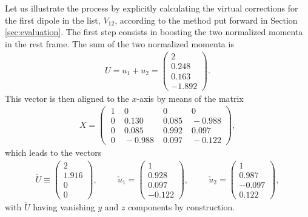 \documentclass[11pt,a4paper]{article}
\begin{document}
Let us illustrate the process by explicitly calculating  the virtual corrections for the first dipole in the list, $V_{12}$, according to the method put forward in Section \ref{sec:evaluation}. The first step consists in boosting the two normalized momenta in the rest frame.
The sum of the two normalized momenta is 
\begin{align}
U=u_1+u_2=\left(\begin{matrix} 2\\0.248\\ 0.163\\-1.892\end{matrix}\right).
\end{align}
This vector is then aligned to the $x$-axis by means of the matrix 
\begin{align}
X =  \left(
\begin{array}{cccc}
\; 1&\; 0 &\;0 &\; 0\\
\; 0 &\; 0.130 &\; 0.085  &\;-0.988  \\
\; 0 &\; 0.085  &\; 0.992 &\;  0.097 \\
\; 0&\; -0.988&\; 0.097 &\; -0.122
\end{array}
\right),
\end{align}
which leads to the vectors 
\begin{align} \label{eq:checkU}
\check{ U }\equiv\left(\begin{matrix} 2\\1.916\\ 0\\0\end{matrix}\right),\hspace{1cm}\check{ u }_1=\left(\begin{matrix} 1\\0.928\\ 0.097\\-0.122\end{matrix}\right),\hspace{1cm}\check{ u }_2=\left(\begin{matrix} 1\\0.987\\ -0.097\\0.122\end{matrix}\right),
\end{align}
with $\check{ U }$ having vanishing $y$ and $z$ components by construction.
\end{document}
